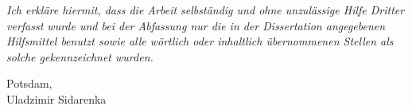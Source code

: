 \vspace*{\fill}

\textit{Ich erkl\"are hiermit, dass die Arbeit selbst\"andig und ohne
  unzul\"assige Hilfe Dritter verfasst wurde und bei der Abfassung nur
  die in der Dissertation angegebenen Hilfsmittel benutzt sowie alle
  w\"ortlich oder inhaltlich \"ubernommenen Stellen als solche
  gekennzeichnet wurden.}

\begin{flushright}
Potsdam, \the\year\\
Uladzimir Sidarenka
\end{flushright}
\vspace*{\fill}
